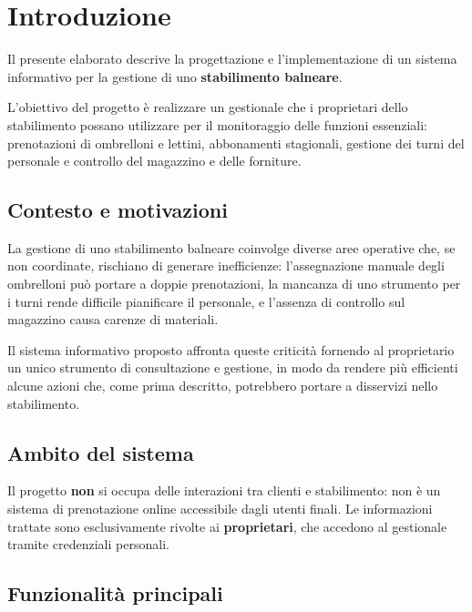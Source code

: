 \chapter{Introduzione}

Il presente elaborato descrive la progettazione e l'implementazione di un sistema
informativo per la gestione di uno \textbf{stabilimento balneare}.

L'obiettivo del progetto è realizzare un gestionale che i proprietari dello stabilimento
possano utilizzare per il monitoraggio delle funzioni essenziali: prenotazioni di ombrelloni
e lettini, abbonamenti stagionali, gestione dei turni del personale e controllo del magazzino
e delle forniture.

\section{Contesto e motivazioni}

La gestione di uno stabilimento balneare coinvolge diverse aree operative che, se
non coordinate, rischiano di generare inefficienze: l'assegnazione manuale degli
ombrelloni può portare a doppie prenotazioni, la mancanza di uno strumento per i
turni rende difficile pianificare il personale, e l'assenza di controllo sul magazzino
causa carenze di materiali.

Il sistema informativo proposto affronta queste criticità fornendo al proprietario
un unico strumento di consultazione e gestione, in modo da rendere più efficienti alcune azioni 
che, come prima descritto, potrebbero portare a disservizi nello stabilimento.

\section{Ambito del sistema}

Il progetto \textbf{non} si occupa delle interazioni tra clienti e stabilimento:
non è un sistema di prenotazione online accessibile dagli utenti finali. Le informazioni
trattate sono esclusivamente rivolte ai \textbf{proprietari}, che accedono al gestionale
tramite credenziali personali.

\section{Funzionalità principali}

